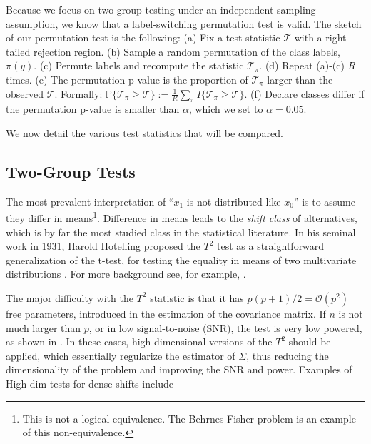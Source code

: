 \documentclass[journal]{IEEEtran}
\begin{document}
Because we focus on two-group testing under an independent sampling assumption, we know that a label-switching permutation test is valid. 
The sketch of our permutation test is the following: \newline
(a) Fix a test statistic $\mathcal{T}$ with a right tailed rejection region. \newline
(b) Sample a random permutation of the class labels, $\pi(y)$. \newline
(c) Permute labels and recompute the statistic $\mathcal{T}_\pi$. \newline
(d) Repeat (a)-(c) $R$ times. \newline
(e) The permutation p-value is the proportion of  $\mathcal{T}_\pi$ larger than the observed $\mathcal{T}$. Formally: 
$\mathbb{P}\{\mathcal{T}_\pi \geq \mathcal{T}\}:=\frac{1}{R} \sum_{\pi} I\{\mathcal{T}_\pi \geq \mathcal{T}\}$.\newline
(f) Declare classes differ if the permutation p-value is smaller than $\alpha$, which we set to $\alpha=0.05$.
\bigskip

We now detail the various test statistics that will be compared.


\subsection{Two-Group Tests}
The most prevalent interpretation of ``$x_1$ is not distributed like $x_0$'' is to assume they differ in means\footnote{This is not a logical equivalence. The Behrnes-Fisher problem is an example of this non-equivalence.}. 
Difference in means leads to the \emph{shift class} of alternatives, which is by far the most studied class in the statistical literature. 
In his seminal work in 1931, Harold Hotelling proposed the $T^2$ test as a straightforward generalization of the t-test, for testing the equality in means of two multivariate distributions \cite{hotelling_generalization_1931}. 
For more background see, for example, \cite{anderson_introduction_2003}.

The major difficulty with the $T^2$ statistic is that it has $p(p+1)/2=\mathcal{O}(p^2)$ free parameters, introduced in the estimation of the covariance matrix.
If $n$ is not much larger than $p$, or in low signal-to-noise (SNR), the test is very low powered, as shown in \cite{bai1996effect}. 
In these cases, high dimensional versions of the $T^2$ should be applied, which essentially regularize the estimator of $\Sigma$, thus reducing the dimensionality of the problem and improving the SNR and power.
Examples of High-dim tests for dense shifts include 
\cite{dempster1958high,bai1996effect,schafer_shrinkage_2005,goeman2006testing,srivastava_test_2008,chen_two-sample_2010,lopes2011more,ahmad2014u,thulin2014high,feng2015note}
\end{document}
